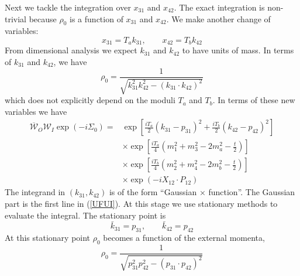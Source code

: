 Next we tackle the integration over $x_{31}$ and $x_{42}$. The exact integration is non-trivial because $\rho_{0}$ is a function of $x_{31}$ and $x_{42}$. We make another change of variables:
\begin{equation}
	x_{31} = T_{a} k_{31}, \qquad x_{42} = T_{b} k_{42}
\end{equation}
From dimensional analysis we expect $k_{31}$ and $k_{42}$ to have units of mass. In terms of $k_{31}$ and $k_{42}$, we have
\begin{equation}
	\rho_{0} = \frac{1}{\sqrt{k_{31}^{2} k_{42}^{2} - (k_{31} \cdot k_{42})^{2}}}
\end{equation}
which does not explicitly depend on the moduli $T_{a}$ and $T_{b}$. In terms of these new variables we have
\begin{equation}
\begin{split}
	\overline{\mathcal{W}}_{O} \mathcal{W}_{I} \exp{\left( -i \Sigma_{0} \right)} = {}& \exp{\left[ \frac{i T_{a}}{2} \left( k_{31} - p_{31} \right)^{2} + \frac{i T_{b}}{2} \left( k_{42} - p_{42} \right)^{2} \right]} \\
	&\times \exp{\left[ \frac{i T_{a}}{4} \left(m_{1}^{2} + m_{3}^{2} - 2 m_{a}^{2} - \frac{t}{2} \right) \right]} \\
	&\times \exp{\left[ \frac{i T_{b}}{4} \left(m_{2}^{2} + m_{4}^{2} - 2 m_{b}^{2} - \frac{t}{2} \right) \right]} \\
	&\times \exp{\left( - i X_{12} \cdot P_{12} \right)}
\end{split} \label{UFUI}
\end{equation}
The integrand in $(k_{31}, k_{42})$ is of the form ``Gaussian $\times$ function''. The Gaussian part is the first line in (\ref{UFUI}). At this stage we use stationary methods to evaluate the integral. The stationary point is
\begin{equation}
	\bar{k}_{31} = p_{31}, \qquad \bar{k}_{42} = p_{42}
\end{equation}
At this stationary point $\rho_{0}$ becomes a function of the external momenta,
\begin{equation}
	\rho_{0} = \frac{1}{\sqrt{p_{31}^{2} p_{42}^{2} - (p_{31} \cdot p_{42})^{2}}}
\end{equation}

